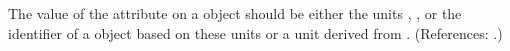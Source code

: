 The value of the attribute  on a \Model object should be
either the units , , or the identifier of a
\UnitDefinition object based on these units or a unit derived from
.  (References: .)
